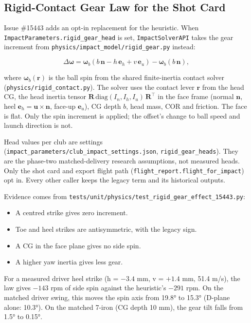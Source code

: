 \documentclass[
]{article}
\begin{document}
\subsection{Rigid-Contact Gear Law for the Shot
Card}\label{rigid-contact-gear-law-for-the-shot-card}

Issue \#15443 adds an opt-in replacement for the heuristic. When
\texttt{ImpactParameters.rigid\_gear\_head} is set,
\texttt{ImpactSolverAPI} takes the gear increment from
\texttt{physics/impact\_model/rigid\_gear.py} instead:

\[\Delta\boldsymbol\omega = \boldsymbol\omega_b(b\,\mathbf n - h\,\mathbf e_h + v\,\mathbf e_u) - \boldsymbol\omega_b(b\,\mathbf n),\]

where \(\boldsymbol\omega_b(\mathbf r)\) is the ball spin from the shared
finite-inertia contact solver (\texttt{physics/rigid\_contact.py}). The
solver uses the contact lever \(\mathbf r\) from the head CG, the head
inertia tensor
\(\mathbf R\,\mathrm{diag}(I_n, I_h, I_u)\,\mathbf R^\top\) in the face
frame (normal \(\mathbf n\), heel
\(\mathbf e_h = \mathbf u \times \mathbf n\), face-up \(\mathbf e_u\)),
CG depth \(b\), head mass, COR and friction. The face is flat. Only the
spin increment is applied; the offset's change to ball speed and launch
direction is not.

Head values per club are settings
(\texttt{impact\_parameters/club\_impact\_settings.json},
\texttt{rigid\_gear\_heads}). They are the phase-two matched-delivery
research assumptions, not measured heads. Only the shot card and export
flight path (\texttt{flight\_report.flight\_for\_impact}) opt in. Every
other caller keeps the legacy term and its historical outputs.

Evidence comes from
\texttt{tests/unit/physics/test\_rigid\_gear\_effect\_15443.py}:

\begin{itemize}
\item A centred strike gives zero increment.
\item Toe and heel strikes are antisymmetric, with the legacy sign.
\item A CG in the face plane gives no side spin.
\item A higher yaw inertia gives less gear.
\end{itemize}

For a measured driver heel strike (h = \(-3.4\) mm, v = \(+1.4\) mm,
51.4 m/s), the law gives \(-143\) rpm of side spin against the
heuristic's \(-291\) rpm. On the matched driver swing, this moves the
spin axis from 19.8° to 15.3° (D-plane alone: 10.3°). On the matched
7-iron (CG depth 10 mm), the gear tilt falls from 1.5° to 0.15°.
\end{document}
